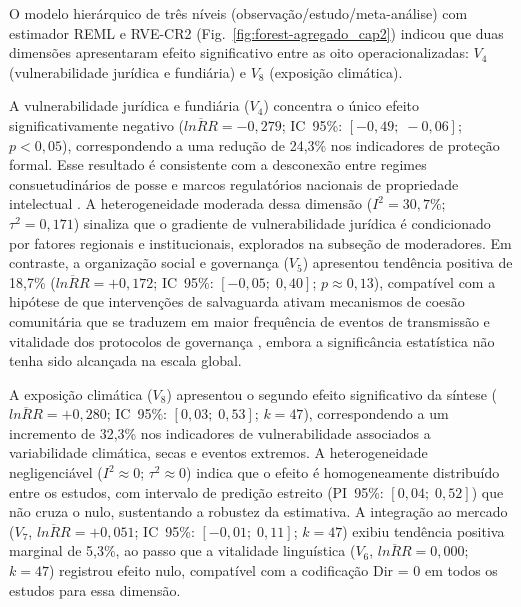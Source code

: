 O modelo hierárquico de três níveis (observação/estudo/meta-análise) com estimador REML e RVE-CR2 (Fig.~\ref{fig:forest-agregado_cap2}) indicou que duas dimensões apresentaram efeito significativo entre as oito operacionalizadas: $V_4$ (vulnerabilidade jurídica e fundiária) e $V_8$ (exposição climática).

A vulnerabilidade jurídica e fundiária ($V_4$) concentra o único efeito significativamente negativo ($\overline{lnRR} = -0{,}279$; IC~95\%: $[-0{,}49;\; -0{,}06]$; $p < 0{,}05$), correspondendo a uma redução de 24,3\% nos indicadores de proteção formal. Esse resultado é consistente com a desconexão entre regimes consuetudinários de posse e marcos regulatórios nacionais de propriedade intelectual \cite{Santilli2009,Dutfield2004,Cottier2004}. A heterogeneidade moderada dessa dimensão ($I^2 = 30{,}7\%$; $\tau^2 = 0{,}171$) sinaliza que o gradiente de vulnerabilidade jurídica é condicionado por fatores regionais e institucionais, explorados na subseção de moderadores. Em contraste, a organização social e governança ($V_5$) apresentou tendência positiva de 18,7\% ($\overline{lnRR} = +0{,}172$; IC~95\%: $[-0{,}05;\; 0{,}40]$; $p \approx 0{,}13$), compatível com a hipótese de que intervenções de salvaguarda ativam mecanismos de coesão comunitária que se traduzem em maior frequência de eventos de transmissão e vitalidade dos protocolos de governança \cite{Ostrom1990,Pretty2003,Berkes2007,Rathwell2015}, embora a significância estatística não tenha sido alcançada na escala global.

A exposição climática ($V_8$) apresentou o segundo efeito significativo da síntese ($\overline{lnRR} = +0{,}280$; IC~95\%: $[0{,}03;\; 0{,}53]$; $k = 47$), correspondendo a um incremento de 32,3\% nos indicadores de vulnerabilidade associados a variabilidade climática, secas e eventos extremos. A heterogeneidade negligenciável ($I^2 \approx 0$; $\tau^2 \approx 0$) indica que o efeito é homogeneamente distribuído entre os estudos, com intervalo de predição estreito (PI~95\%: $[0{,}04;\; 0{,}52]$) que não cruza o nulo, sustentando a robustez da estimativa. A integração ao mercado ($V_7$, $\overline{lnRR} = +0{,}051$; IC~95\%: $[-0{,}01;\; 0{,}11]$; $k = 47$) exibiu tendência positiva marginal de 5,3\%, ao passo que a vitalidade linguística ($V_6$, $\overline{lnRR} = 0{,}000$; $k = 47$) registrou efeito nulo, compatível com a codificação Dir = 0 em todos os estudos para essa dimensão.


